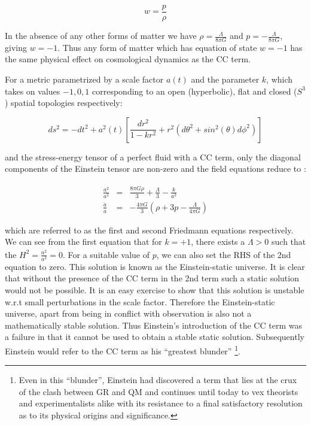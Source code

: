 \begin{doublespace}
\begin{equation}
w=\frac{p}{\rho}\end{equation}


In the absence of any other forms of matter we have $\rho=\frac{\Lambda}{8\pi G}$
and $p=-\frac{\Lambda}{8\pi G}$, giving $w=-1$. Thus any form of
matter which has equation of state $w=-1$ has the same physical effect
on cosmological dynamics as the CC term.

For a metric parametrized by a scale factor $a(t)$ and the parameter
$k$, which takes on values $-1,0,1$ corresponding to an open (hyperbolic),
flat and closed ($S^{3}$) spatial topologies respectively:

\begin{equation}
ds^{2}=-dt^{2}+a^{2}(t)\left[ \frac{dr^{2}}{1-kr^{2}}+r^{2}(d\theta^{2}+sin^{2}(\theta)d\phi^{2}) \right]\end{equation}


and the stress-energy tensor of a perfect fluid with a CC term, only
the diagonal components of the Einstein tensor are non-zero and the
field equations reduce to \cite{Wald1984General}:

\begin{eqnarray}\label{eqn:Friedmann}
\frac{\dot{a^{2}}}{a^{2}} & = &\frac{8\pi G\rho}{3}+\frac{\Lambda}{3}-\frac{k}{a^{2}} \\
\frac{\ddot{a}}{a} & = & -\frac{4\pi G}{3}(\rho+3p-\frac{\Lambda}{4\pi G})
\end{eqnarray}


which are referred to as the first and second Friedmann equations
respectively. We can see from the first equation that for $k=+1$,
there exists a $\Lambda>0$ such that the $H^{2}=\frac{\dot{a^{2}}}{a^{2}}=0$.
For a suitable value of $p$, we can also set the RHS of the 2nd equation
to zero. This solution is known as the Einstein-static universe. It
is clear that without the presence of the CC term in the 2nd term
such a static solution would not be possible. It is an easy exercise
to show that this solution is unstable w.r.t small perturbations in
the scale factor. Therefore the Einstein-static universe, apart from
being in conflict with observation is also not a mathematically stable
solution. Thus Einstein's introduction of the CC term was a failure
in that it cannot be used to obtain a stable static solution. Subsequently
Einstein would refer to the CC term as his {}``greatest blunder''%
\footnote{Even in this {}``blunder'', Einstein had discovered a term that
lies at the crux of the clash between GR and QM and continues until
today to vex theorists and experimentalists alike with its resistance
to a final satisfactory resolution as to its physical origins and
significance.%
}.


\end{doublespace}
